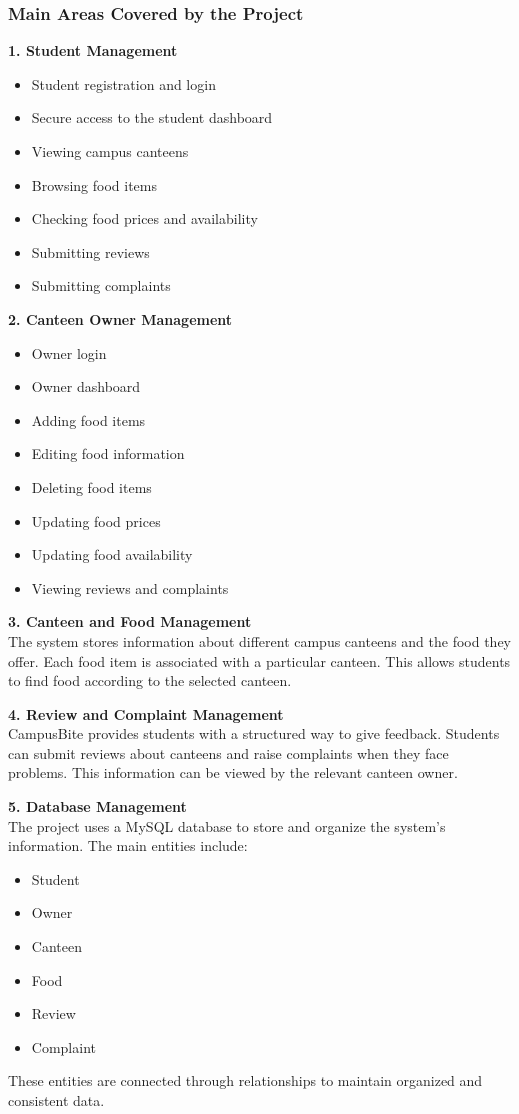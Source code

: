 \documentclass[ 12pt,a4paper,twocolumn,fleqn]{article}
\begin{document}
\subsubsection{Main Areas Covered by the Project}

\textbf{1. Student Management}
\begin{itemize}
    \item Student registration and login
    \item Secure access to the student dashboard
    \item Viewing campus canteens
    \item Browsing food items
    \item Checking food prices and availability
    \item Submitting reviews
    \item Submitting complaints
\end{itemize}

\textbf{2. Canteen Owner Management}
\begin{itemize}
    \item Owner login
    \item Owner dashboard
    \item Adding food items
    \item Editing food information
    \item Deleting food items
    \item Updating food prices
    \item Updating food availability
    \item Viewing reviews and complaints
\end{itemize}

\textbf{3. Canteen and Food Management} \\
The system stores information about different campus canteens and the food they offer. Each food item is associated with a particular canteen. This allows students to find food according to the selected canteen.

\textbf{4. Review and Complaint Management} \\
CampusBite provides students with a structured way to give feedback. Students can submit reviews about canteens and raise complaints when they face problems. This information can be viewed by the relevant canteen owner.

\textbf{5. Database Management} \\
The project uses a MySQL database to store and organize the system's information. The main entities include:
\begin{itemize}
    \item Student
    \item Owner
    \item Canteen
    \item Food
    \item Review
    \item Complaint
\end{itemize}
These entities are connected through relationships to maintain organized and consistent data.
\end{document}

